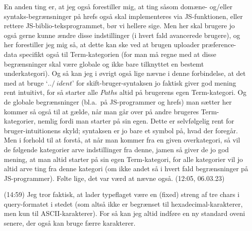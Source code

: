 \documentclass{report}
\begin{document}
En anden ting er, at jeg også forestiller mig, at ting såsom domæne- og/eller syntaks-begrænsninger på hrefs også skal implementeres via JS-funktionen, eller rettere JS-biblio-teksprogrammet, bør vi hellere sige. Men her skal brugere jo også gerne kunne ændre disse indstillinger (i hvert fald avancerede brugere), og her forestiller jeg mig så, at dette kan ske ved at brugen uploader præference-data specifikt også til Term-kategorien (for man må regne med at disse begrænsninger skal være globale og ikke bare tilknyttet en bestemt underkategori). Og så kan jeg i øvrigt også lige nævne i denne forbindelse, at det med at bruge `$\texttt{../}\ ident$' for skift-bruger-syntaksen jo faktisk giver god mening rent intuitivt, for så starter alle $Path$s altid på brugerens egen Term-kategori. Og de globale begrænsninger (bl.a.\ på JS-programmer og hrefs) man sætter her kommer så også til at gælde, når man går over på andre brugeres Term-kategorier, nemlig fordi man starter på sin egen. Dette er selvfølgelig rent for bruger-intuitionens skyld; syntaksen er jo bare et symbol på, hvad der foregår. Men i forhold til at forstå, at når man kommer fra en given overkategori, så vil de følgende kategorier arve indstillinger fra denne, jamen så giver de jo god mening, at man altid starter på sin egen Term-kategori, for alle kategorier vil jo altid arve ting fra denne kategori (om ikke andet så i hvert fald begrænsninger på JS-programmer). Følte lige, det var værd at nævne også. (12:05, 06.03.23) 

(14:59) Jeg tror faktisk, at lader typeflaget være en (fixed) streng af tre chars i query-formatet i stedet (som altså ikke er begrænset til hexadecimal-karakterer, men kun til ASCII-karakterer). For så kan jeg altid indføre en ny standard oveni senere, der også kan bruge færre karakterer. 
\end{document}
